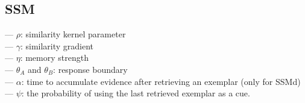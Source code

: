 \documentclass[doc]{apa6}
\begin{document}
\subsection{SSM}
\indent --- $\rho$: similarity kernel parameter\\
\indent --- $\gamma$: similarity gradient\\
\indent --- $\eta$: memory strength\\
\indent --- $\theta_{A}$ and $\theta_{B}$: response boundary\\
\indent --- $\alpha$: time to accumulate evidence after retrieving an exemplar (only for SSMd)\\
\indent --- $\psi$: the probability of using the last retrieved exemplar as a cue.



\printbibliography{}
\end{document}
